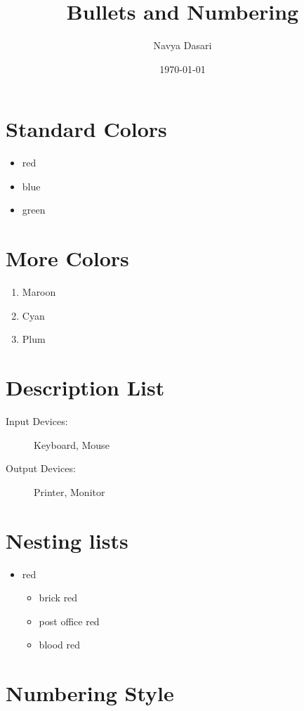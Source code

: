 \documentclass[12pt]{article}
\title{Bullets and Numbering}
\author{Navya Dasari}
\date{\today}
\begin{document}
	\maketitle
	\section{Standard Colors}
	
	\begin{itemize}
		\item red
		\item blue
		\item green
	\end{itemize}
	
	\section{More Colors}
	\begin{enumerate}
		\item Maroon
		\item Cyan
		\item Plum
	\end{enumerate}
	
	\section{Description List}
	
	\begin{description}
		\item[Input Devices:] Keyboard, Mouse
		
		\item[Output Devices:] Printer, Monitor
	\end{description}
	
	\section{Nesting lists}
	
		\begin{itemize}
			\item red
				\begin{itemize}
					\item brick red
					\item post office red
					\item blood red
				\end{itemize}
		\end{itemize}

	\section{Numbering Style}
	
\end{document}
